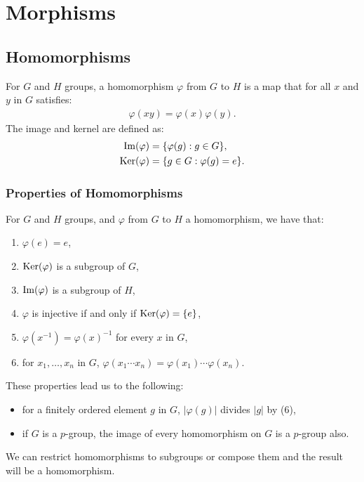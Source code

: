 \section{Morphisms}

\subsection{Homomorphisms}

For $G$ and $H$ groups, a homomorphism $\varphi$ from $G$ to $H$ is a map that 
for all $x$ and $y$ in $G$ satisfies:
\begin{align*}
    \varphi(xy) = \varphi(x)\varphi(y).
\end{align*} The image and kernel are defined as: \begin{align*}
    \operatorname{Im}(\varphi) &= \{\varphi(g) : g \in G\}, \\
    \operatorname{Ker}(\varphi) &= \{g \in G : \varphi(g) = e\}.
\end{align*} 

\subsubsection{Properties of Homomorphisms} 
\label{2.2} \label{2.3} \label{2.4} \label{2.5} \label{2.6}

For $G$ and $H$ groups, and $\varphi$ from $G$ to $H$ a homomorphism, we have that:
\begin{enumerate}
    \item $\varphi(e) = e$,
    \item $\operatorname{Ker}(\varphi)$ is a subgroup of $G$,
    \item $\operatorname{Im}(\varphi)$ is a subgroup of $H$,
    \item $\varphi$ is injective if and only if $\operatorname{Ker}(\varphi) = \{e\}$,
    \item $\varphi(x^{-1}) = \varphi(x)^{-1}$ for every $x$ in $G$,
    \item for $x_1, \ldots, x_n$ in $G$,
        $\varphi(x_1 \cdots x_n) = \varphi(x_1) \cdots \varphi(x_n)$.
\end{enumerate} These properties lead us to the following: \begin{itemize}
    \item for a finitely ordered element $g$ in $G$, $|\varphi(g)|$
        divides $|g|$ by (6),
    \item if $G$ is a $p$-group, the image of every
        homomorphism on $G$ is a $p$-group also.
\end{itemize} We can restrict homomorphisms to subgroups or compose them
and the result will be a homomorphism.

